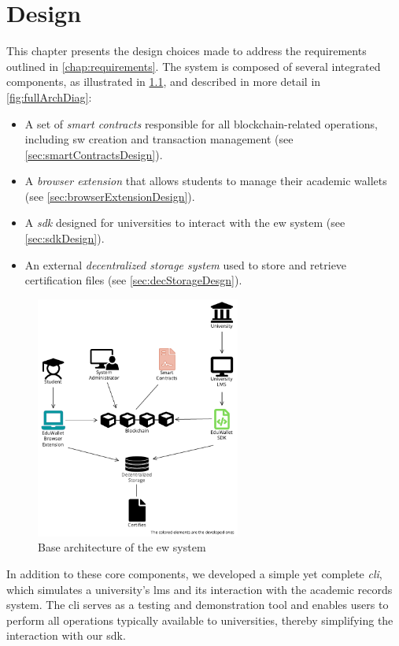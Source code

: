 \chapter{Design}
This chapter presents the design choices made to address the requirements outlined in \cref{chap:requirements}. The system is composed of several integrated components, as illustrated in \cref{fig:baseArchDiag}, and described in more detail in \cref{fig:fullArchDiag}:
\begin{itemize}
    \item A set of \textit{smart contracts} responsible for all blockchain-related operations, including \acrshort{sw} creation and transaction management (see \cref{sec:smartContractsDesign}).
    \item A \textit{browser extension} that allows students to manage their academic wallets (see \cref{sec:browserExtensionDesign}).
    \item A \textit{\acrfull{sdk}} designed for universities to interact with the \acrshort{ew} system (see \cref{sec:sdkDesign}).
    \item An external \textit{decentralized storage system} used to store and retrieve certification files (see \cref{sec:decStorageDesgn}).
\end{itemize}
\begin{figure}
  \centering
  \includegraphics[width=0.6\textwidth]{figures/Architecture diagram basic.pdf}
  \caption[System basic architecture diagram]{Base architecture of the \acrlong{ew} system}
  \label{fig:baseArchDiag}
\end{figure}
In addition to these core components, we developed a simple yet complete \textit{\acrfull{cli}}, which simulates a university's \acrshort{lms} and its interaction with the academic records system. The \acrshort{cli} serves as a testing and demonstration tool and enables users to perform all operations typically available to universities, thereby simplifying the interaction with our \acrshort{sdk}.

